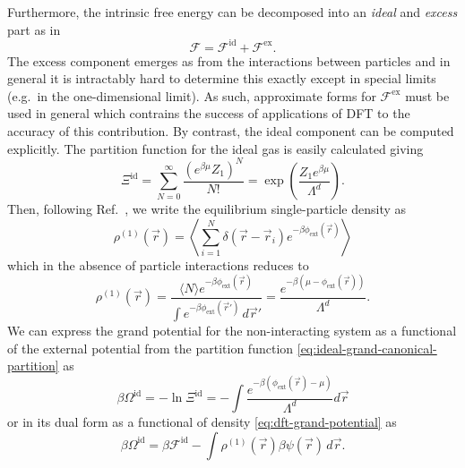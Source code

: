Furthermore, the intrinsic free energy can be decomposed into an \emph{ideal} and \emph{excess} part as in
\begin{equation}\label{eq:F-decomposition}
  \mathcal{F}
  =
  \mathcal{F}^\mathrm{id} +
  \mathcal{F}^\mathrm{ex}.
\end{equation}
The excess component emerges as from the interactions between particles and in general it is intractably hard to determine this exactly except in special limits (e.g.\ in the one-dimensional limit).
As such, approximate forms for $\mathcal{F}^\mathrm{ex}$ must be used in general which contrains the success of applications of DFT to the accuracy of this contribution.
By contrast, the ideal component can be computed explicitly.
The partition function for the ideal gas is easily calculated giving
\begin{equation}\label{eq:ideal-grand-canonical-partition}
  \Xi^\mathrm{id}
  =
  \sum_{N=0}^\infty
  \frac{(e^{\beta\mu} Z_1)^N}{N!}
  =
  \exp{\left( \frac{Z_1 e^{\beta \mu}}{\Lambda^d} \right)}.
\end{equation}
Then, following Ref.\ \cite{AshcroftAJP1996}, we write the equilibrium single-particle density as
\begin{equation*}
  \rho^{(1)}(\vec{r})
  =
  \left\langle
  \sum_{i=1}^N \delta(\vec{r} - \vec{r}_i)
  e^{-\beta \phi_\mathrm{ext}(\vec{r})}
  \right\rangle
\end{equation*}
which in the absence of particle interactions reduces to
\begin{equation}\label{eq:ideal-density}
  \rho^{(1)}(\vec{r})
  =
  \frac{
    \langle N \rangle e^{-\beta \phi_\mathrm{ext}(\vec{r})}
  }{
    \int e^{-\beta \phi_\mathrm{ext}(\vec{r}')} \, d\vec{r}'
  }
  =
  \frac{e^{-\beta (\mu - \phi_\mathrm{ext}(\vec{r}))}}{\Lambda^d}.
\end{equation}
We can express the grand potential for the non-interacting system as a functional of the external potential from the partition function \eqref{eq:ideal-grand-canonical-partition} as
\begin{equation*}
  \beta\Omega^\mathrm{id}
  =
  - \ln{\Xi^\mathrm{id}}
  =
  - \int \frac{e^{-\beta (\phi_\mathrm{ext}(\vec{r}) - \mu)}}{\Lambda^d} d\vec{r}
\end{equation*}
or in its dual form as a functional of density \eqref{eq:dft-grand-potential} as
\begin{equation*}
  \beta\Omega^\mathrm{id}
  =
  \beta \mathcal{F}^\mathrm{id}
  - \int \rho^{(1)}(\vec{r}) \beta \psi(\vec{r}) \, d\vec{r}.
\end{equation*}
